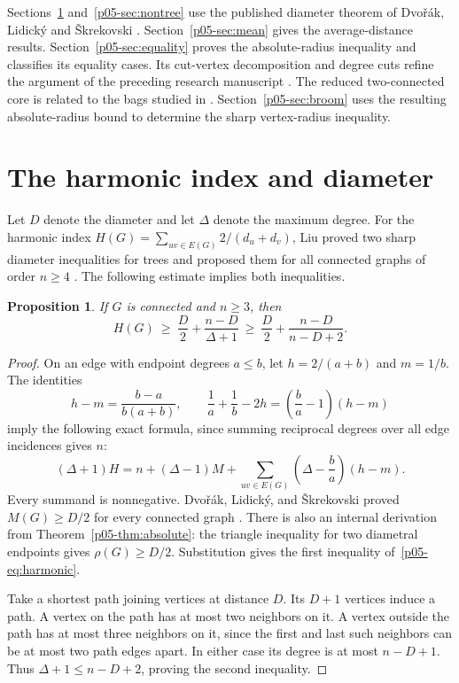 \documentclass[11pt,a4paper]{article}
\newtheorem{proposition}[theorem]{Proposition}
\begin{document}
Sections~\ref{p05-sec:harmonic} and~\ref{p05-sec:nontree} use the published
diameter theorem of Dvo\v{r}\'ak, Lidick\'y and \v{S}krekovski
\cite{p05-DLS}. Section~\ref{p05-sec:mean} gives the average-distance results.
Section~\ref{p05-sec:equality} proves the absolute-radius inequality and
classifies its equality cases. Its cut-vertex decomposition and degree
cuts refine the argument of the preceding research manuscript \cite{p05-KS}. The reduced two-connected core is related to the bags studied in
\cite{p05-CPS}. Section~\ref{p05-sec:broom} uses the resulting absolute-radius
bound to determine the sharp vertex-radius inequality.

\section{The harmonic index and diameter}\label{p05-sec:harmonic}
Let $D$ denote the diameter and let $\Delta$ denote the maximum degree.
For the harmonic index
$H(G)=\sum_{uv\in E(G)}2/(d_u+d_v)$,
Liu proved two sharp diameter inequalities for trees and proposed
them for all connected graphs of order $n\ge4$
\cite[Theorem~2.5 and Conjecture~2.6]{p05-Liu}. The following estimate
implies both inequalities.

\begin{proposition}\label{p05-prop:harmonic}
If $G$ is connected and $n\ge3$, then
\begin{equation}\label{p05-eq:harmonic}
 H(G)\ \ge\ \frac D2+\frac{n-D}{\Delta+1}
       \ \ge\ \frac D2+\frac{n-D}{n-D+2}.
\end{equation}
\end{proposition}
\begin{proof}
On an edge with endpoint degrees $a\le b$, let $h=2/(a+b)$ and
$m=1/b$. The identities
\[
 h-m=\frac{b-a}{b(a+b)},\qquad
 \frac1a+\frac1b-2h
   =\left(\frac ba-1\right)(h-m)
\]
imply the following exact formula, since summing reciprocal degrees
over all edge incidences gives $n$:
\begin{equation}\label{p05-eq:harmonic-slack}
 (\Delta+1)H
 =n+(\Delta-1)M+
   \sum_{uv\in E(G)}\left(\Delta-\frac ba\right)(h-m).
\end{equation}
Every summand is nonnegative.
Dvo\v{r}\'{a}k, Lidick\'{y}, and \v{S}krekovski proved
$M(G)\ge D/2$ for every connected graph \cite[Theorem~3]{p05-DLS}.
There is also an internal derivation from Theorem~\ref{p05-thm:absolute}:
the triangle inequality for two diametral endpoints gives
$\rho(G)\ge D/2$. Substitution gives the first inequality of~\eqref{p05-eq:harmonic}.

Take a shortest path joining vertices at distance $D$. Its $D+1$
vertices induce a path. A vertex on the path has at most two neighbors
on it. A vertex outside the path has at most three neighbors on it,
since the first and last such neighbors can be at most two path edges
apart. In either case its degree is at most $n-D+1$. Thus
$\Delta+1\le n-D+2$, proving the second inequality.
\end{proof}
\end{document}
